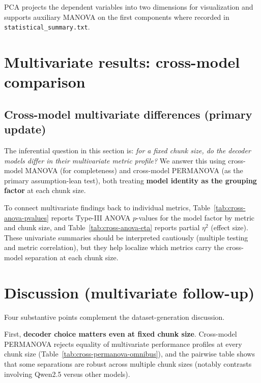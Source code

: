 \documentclass[11pt]{article}
\begin{document}
PCA projects the dependent variables into two dimensions for visualization and supports auxiliary MANOVA on the first components where recorded in \texttt{statistical\_summary.txt}.

\section{Multivariate results: cross-model comparison}
\label{sec:cross-model-multivariate}

\subsection{Cross-model multivariate differences (primary update)}

The inferential question in this section is: \emph{for a fixed chunk size, do the decoder models differ in their multivariate metric profile?} We answer this using cross-model MANOVA (for completeness) and cross-model PERMANOVA (as the primary assumption-lean test), both treating \textbf{model identity as the grouping factor} at each chunk size.





To connect multivariate findings back to individual metrics, Table~\ref{tab:cross-anova-pvalues} reports Type-III ANOVA $p$-values for the model factor by metric and chunk size, and Table~\ref{tab:cross-anova-eta} reports partial $\eta^2$ (effect size). These univariate summaries should be interpreted cautiously (multiple testing and metric correlation), but they help localize which metrics carry the cross-model separation at each chunk size.




\section{Discussion (multivariate follow-up)}

Four substantive points complement the dataset-generation discussion.

First, \textbf{decoder choice matters even at fixed chunk size}. Cross-model PERMANOVA rejects equality of multivariate performance profiles at every chunk size (Table~\ref{tab:cross-permanova-omnibus}), and the pairwise table shows that some separations are robust across multiple chunk sizes (notably contrasts involving Qwen2.5 versus other models).
\end{document}
